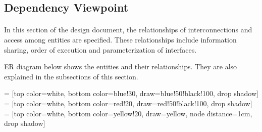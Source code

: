 
\subsection{Dependency Viewpoint}
\paragraph{}
\normalsize
	In this section of the design document, the relationships of interconnections and access among entities are specified. These relationships include information sharing, order of execution and parameterization of interfaces.
        
        ER diagram below shows the entities and their relationships. They are also explained in the subsections of this section.
       
\usetikzlibrary{positioning}
\usetikzlibrary{shadows}

 = [top color=white, bottom color=blue!30, 
                            draw=blue!50!black!100, drop shadow]
 = [top color=white, bottom color=red!20, 
                                  draw=red!50!black!100, drop shadow]
 = [top color=white, bottom color=yellow!20, 
                               draw=yellow, node distance=1cm, drop shadow]
                               
